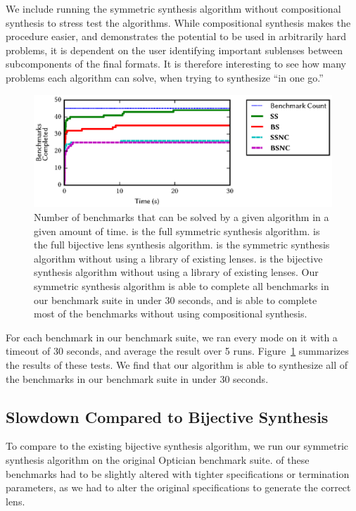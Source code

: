 \documentclass[acmsmall,screen,anonymous]{acmart}
\begin{document}
We include running the symmetric synthesis algorithm without compositional
synthesis to stress test the algorithms. While compositional synthesis makes the
procedure easier, and demonstrates the potential to be used in arbitrarily hard
problems, it is dependent on the user identifying important sublenses between
subcomponents of the final formats. It is therefore interesting to see how many
problems each algorithm can solve, when trying to synthesize ``in one go.''

\begin{figure}
  \includegraphics{generated-graphs/times}
  \caption{Number of benchmarks that can be solved by a given algorithm in a
    given amount of time. \SSOpt{} is the full symmetric synthesis algorithm.
    \BSOpt{} is the full bijective lens synthesis algorithm. \SSNCOpt{} is the
    symmetric synthesis algorithm without using a library of existing lenses.
    \BSNCOpt{} is the bijective synthesis algorithm without using a library of
    existing lenses. Our symmetric synthesis algorithm is able to complete all
    benchmarks in our benchmark suite in under 30 seconds, and is able to
    complete most of the benchmarks without using compositional synthesis.
    }
  \label{fig:times}
\end{figure}

For each benchmark in our benchmark suite, we ran every mode on it with a
timeout of 30 seconds, and average the result over 5 runs.
Figure~\ref{fig:times} summarizes the results of these tests. We find that our
algorithm is able to synthesize all of the benchmarks in our benchmark suite in
under 30 seconds.

\subsection{Slowdown Compared to Bijective Synthesis}

To compare to the existing bijective synthesis algorithm, we run our symmetric
synthesis algorithm on the original Optician benchmark suite.  of these
benchmarks had to be slightly altered with tighter specifications or termination
parameters, as we had to alter the original specifications to generate the
correct lens.
\end{document}
